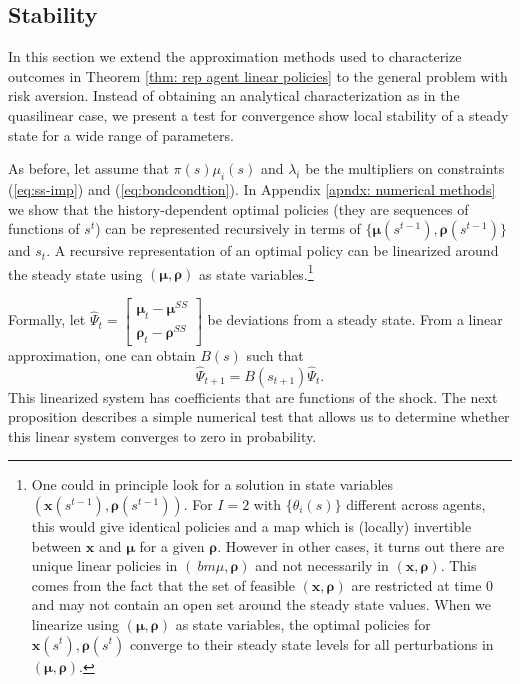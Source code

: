 \documentclass[11.5pt,twoside]{article}
\newcommand{\bmat}{\begin{matrix}}
\newcommand{\emat}{\end{matrix}}
\begin{document}
\subsection{Stability}
In this section we extend the approximation methods used to characterize outcomes in Theorem \ref{thm: rep agent linear policies} to the general problem with risk aversion. Instead of obtaining an analytical characterization as in the quasilinear case, we present a test for convergence show local stability of a steady state for a wide range of parameters. 

As before, let assume that $\pi(s)\mu_i(s)$ and $\lambda_i$ be the multipliers on constraints (\ref{eq:ss-imp}) and (\ref{eq:bondcondtion}). In Appendix \ref{apndx: numerical methods} we show that the history-dependent optimal policies (they are sequences of functions of $s^t$) can be represented  recursively in terms of $\{\bm \mu(s^{t-1}),\bm \rho(s^{t-1})\}$ and $s_t$. A recursive representation of an optimal policy can be linearized around the steady state using $(\bm{\mu},\bm{\rho})$ as state variables.\footnote{One could  in principle look for a solution in state variables $\left(\bm{x}(s^{t-1}),\bm{\rho}(s^{t-1})\right)$. For $I=2$ with $\{\theta_i(s)\}$ different across agents, this would give identical policies and a map which is (locally) invertible between $\bm{x}$ and $\bm{\mu}$ for a given $\bm{\rho}$. However in other cases, it turns out there are unique linear policies in $(\
bm{\mu},\bm{\rho}
)$ and not necessarily in  $(\bm{x},\bm{\rho})$. This comes from the fact that the set of feasible $(\bm{x},\bm{\rho})$ are restricted at time 0 and may not contain an open set around the steady state values. When we linearize using $(\bm{\mu},\bm{\rho})$ as state variables, the optimal policies for $\bm{x}(s^t),\bm{\rho}(s^t)$ converge to their  steady state levels for all perturbations in $(\bm{\mu},\bm{\rho})$.}

Formally, let $\hat{\Psi}_{t}= \left[\bmat \bm{\mu}_{t} - \bm{\mu}^{SS}\\ \bm \rho_t - \bm \rho^{SS}\emat\right]$ be  deviations from a steady state. From a  linear approximation, one can obtain $B(s)$ such that
\begin{equation}
 \hat{\Psi}_{t+1}=B(s_{t+1})\hat{\Psi}_t. \label{eq.linear.lom}
\end{equation}
This linearized system has coefficients that are functions of the shock. The next proposition describes a simple numerical test that allows us to determine whether  this linear system converges to zero in probability.
\end{document}
